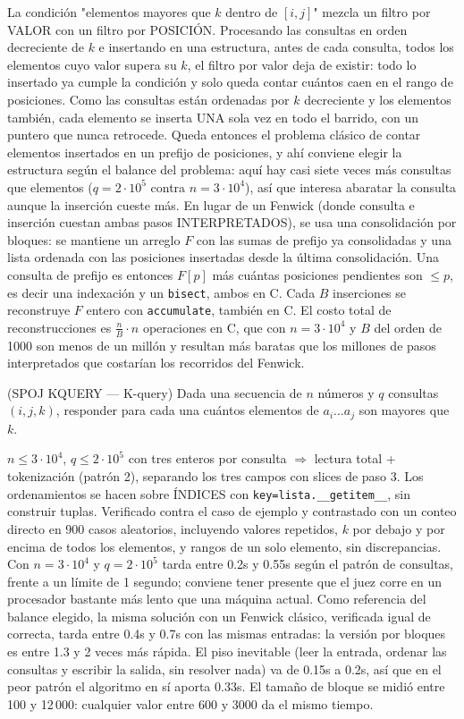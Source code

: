  La condición "elementos mayores que $k$ dentro de $[i,j]$" mezcla un filtro por VALOR con un filtro por POSICIÓN. Procesando las consultas en orden decreciente de $k$ e insertando en una estructura, antes de cada consulta, todos los elementos cuyo valor supera su $k$, el filtro por valor deja de existir: todo lo insertado ya cumple la condición y solo queda contar cuántos caen en el rango de posiciones. Como las consultas están ordenadas por $k$ decreciente y los elementos también, cada elemento se inserta UNA sola vez en todo el barrido, con un puntero que nunca retrocede. Queda entonces el problema clásico de contar elementos insertados en un prefijo de posiciones, y ahí conviene elegir la estructura según el balance del problema: aquí hay casi siete veces más consultas que elementos ($q = 2\cdot10^5$ contra $n = 3\cdot10^4$), así que interesa abaratar la consulta aunque la inserción cueste más. En lugar de un Fenwick (donde consulta e inserción cuestan ambas  pasos INTERPRETADOS), se usa una consolidación por bloques: se mantiene un arreglo $F$ con las sumas de prefijo ya consolidadas y una lista ordenada con las posiciones insertadas desde la última consolidación. Una consulta de prefijo es entonces $F[p]$ más cuántas posiciones pendientes son $\le p$, es decir una indexación y un \texttt{bisect}, ambos en C. Cada $B$ inserciones se reconstruye $F$ entero con \texttt{accumulate}, también en C. El costo total de reconstrucciones es $\frac{n}{B}\cdot n$ operaciones en C, que con $n = 3\cdot10^4$ y $B$ del orden de 1000 son menos de un millón y resultan más baratas que los millones de pasos interpretados que costarían los recorridos del Fenwick.


(SPOJ KQUERY — K-query) Dada una secuencia de $n$ números y $q$ consultas $(i, j, k)$, responder para cada una cuántos elementos de $a_i \ldots a_j$ son mayores que $k$.

 $n \le 3\cdot10^4$, $q \le 2\cdot10^5$ con tres enteros por consulta $\Rightarrow$ lectura total + tokenización (patrón 2), separando los tres campos con slices de paso 3. Los ordenamientos se hacen sobre ÍNDICES con \texttt{key=lista.\_\_getitem\_\_}, sin construir tuplas. Verificado contra el caso de ejemplo y contrastado con un conteo directo en 900 casos aleatorios, incluyendo valores repetidos, $k$ por debajo y por encima de todos los elementos, y rangos de un solo elemento, sin discrepancias. Con $n = 3\cdot10^4$ y $q = 2\cdot10^5$ tarda entre \aprox{}0.2s y \aprox{}0.55s según el patrón de consultas, frente a un límite de 1 segundo; conviene tener presente que el juez corre en un procesador bastante más lento que una máquina actual. Como referencia del balance elegido, la misma solución con un Fenwick clásico, verificada igual de correcta, tarda entre \aprox{}0.4s y \aprox{}0.7s con las mismas entradas: la versión por bloques es entre 1.3 y 2 veces más rápida. El piso inevitable (leer la entrada, ordenar las consultas y escribir la salida, sin resolver nada) va de \aprox{}0.15s a \aprox{}0.2s, así que en el peor patrón el algoritmo en sí aporta \aprox{}0.33s. El tamaño de bloque se midió entre 100 y 12\,000: cualquier valor entre 600 y 3000 da el mismo tiempo.


